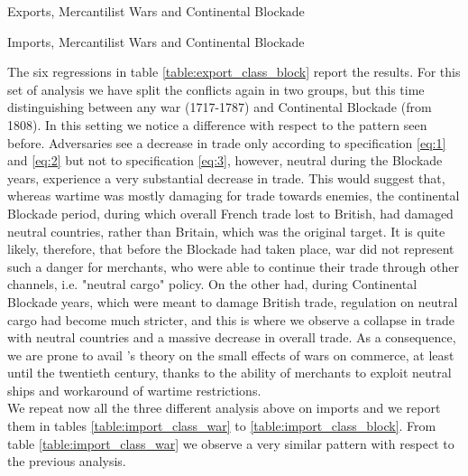 \documentclass[12pt,a4paper,notitlepage,english]{article}
\begin{document}
\begin{table}
\begin{center}
\caption {Exports, Mercantilist Wars and Continental Blockade} 
\label{table:export_class_block}
\renewcommand{\arraystretch}{0.6}

\end{center}
\end{table}
\begin{table}
\begin{center}
\caption {Imports, Mercantilist Wars and Continental Blockade} 
\label{table:import_class_block}
\renewcommand{\arraystretch}{0.6}

\end{center}
\end{table}
The six regressions in table \ref{table:export_class_block} report the results.
For this set of analysis we have split the conflicts again in two groups, but this time distinguishing between any war (1717-1787) and Continental Blockade (from 1808).
In this setting we notice a difference with respect to the pattern seen before.
Adversaries see a decrease in trade only according to specification \ref{eq:1} and \ref{eq:2} but not to specification \ref{eq:3}, however, neutral during the Blockade years, experience a very substantial decrease in trade.
This would suggest that, whereas wartime was mostly damaging for trade towards enemies, the continental Blockade period, during which overall French trade lost to British, had damaged neutral countries, rather than Britain, which was the original target.
It is quite likely, therefore, that before the Blockade had taken place, war did not represent such a danger for merchants, who were able to continue their trade through other channels, i.e. "neutral cargo" policy.
On the other had, during Continental Blockade years, which were meant to damage British trade, regulation on neutral cargo had become much stricter, and this is where we observe a collapse in trade with neutral countries and a massive decrease in overall trade.
As a consequence, we are prone to avail \cite{riley_seven_1986}'s theory on the small effects of wars on commerce, at least until the twentieth century, thanks to the ability of merchants to exploit neutral ships and workaround of wartime restrictions.\\
We repeat now all the three different analysis above on imports and we report them in tables \ref{table:import_class_war} to \ref{table:import_class_block}.
From table \ref{table:import_class_war} we observe a very similar pattern with respect to the previous analysis.
\end{document}
